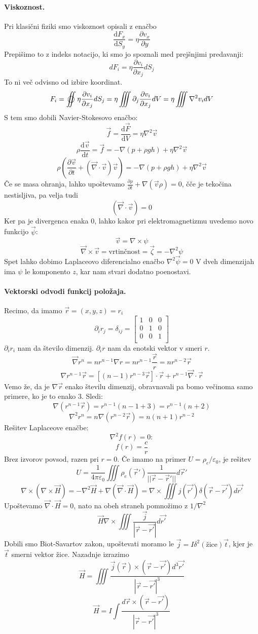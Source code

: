 \documentclass[a4paper]{article}
\newcommand{\vct}[1]{\overrightarrow{#1}}
\newcommand{\pd}[2]{\frac{\partial {#1}}{\partial {#2}}}
\newcommand{\dd}[2]{\frac{\mathrm{d} {#1}}{\mathrm{d} {#2}}}
\begin{document}
\paragraph{Viskoznost.} Pri klasični fiziki smo viskoznost opisali z enačbo
$$\dd{F_x}{S_y} = \eta \pd{v_x}{y}$$
Prepišimo to z indeks notacijo, ki smo jo spoznali med prejšnjimi predavanji:
$$dF_i = \eta\pd{v_i}{x_j}dS_j$$
To ni več odvisno od izbire koordinat.
$$F_i = \varoiint \eta \pd{v_i}{x_j}dS_j = \eta \iiint \partial_j \pd{v_i}{x_j} dV = \eta \iiint \nabla^2 v_i dV$$
S tem smo dobili Navier-Stokesovo enačbo:
$$\vct{f} = \dd{\vct{F}}{V} = \eta \nabla^2\vct{v}$$
$$\rho \dd{\vct{v}}{t} = \vct{f} = -\nabla(p+\rho gh) + \eta\nabla^2\vct{v}$$
$$\rho \left(\pd{\vct{v}}{t} + (\vct\nabla\cdot\vct{v})\vct{v}\right) = -\nabla(p+\rho gh) + \eta\nabla^2\vct{v}$$
Če se masa ohranja, lahko upoštevamo $\displaystyle{\pd{\rho}{t} + \nabla(\vct{v}\rho) = 0}$, čče je tekočina nestisljiva, pa velja tudi
$$(\vct\nabla\cdot\vct{v}) = 0$$
Ker pa je divergenca enaka 0, lahko kakor pri elektromagnetizmu uvedemo novo funkcijo $\vct{\psi}$:
$$\vct{v} = \nabla\times\psi$$
$$\vct{\nabla}\times\vct{v} = \text{vrtinčnost} = \vct\zeta = -\nabla^2\psi$$
Spet lahko dobimo Laplaceovo diferencialno enačbo $\nabla^2\vct{\psi} = 0$
V dveh dimenzijah ima $\psi$ le komponento $z$, kar nam stvari dodatno poenostavi.
\paragraph{Vektorski odvodi funkcij položaja.} Recimo, da imamo $\vct{r} = (x, y, z) = r_i$
$$\partial_ir_j = \delta_{ij} = \begin{bmatrix}
    1 & 0 & 0 \\
    0 & 1 & 0 \\
    0 & 0 & 1 \\
\end{bmatrix}$$
$\partial_i r_i$ nam da število dimenzij. $\partial_ir$ nam da enotski vektor v smeri $r$.
$$\vct\nabla r^n = nr^{n-1}\nabla r = nr^{n-1}\frac{\vct{r}}{r} = nr^{n-2}\vct{r}$$
$$\nabla{r^{n-1}\vct{r}} = [(n-1)r^{n-3}\vct{r}]\cdot\vct{r} + r^{n-1}\vct\nabla\cdot\vct{r}$$
Vemo že, da je $\nabla\vct{r}$ enako številu dimenzij, obravnavali pa bomo večinoma samo primere, ko je to enako 3. Sledi:
$$\nabla (r^{n-1}\vct{r}) = r^{n-1}(n-1+3) = r^{n-1}(n+2)$$
$$\nabla^2r^n = n\nabla(r^{n-2}\vct{r}) = n(n+1)r^{n-2}$$
Rešitev Laplaceove enačbe:
$$\nabla^2f(r) = 0:$$
$$f(r) = \frac{c}{r}$$
Brez izvorov povsod, razen pri $r=0$.
Če imamo na primer $U = \rho_e/\varepsilon_0$, je rešitev $$U = \frac{1}{4\pi\varepsilon_0}\iiint \rho_e(\vct{r}')\frac{1}{||\vct{r} - \vct{r}'||}d\vct{r}'$$
$$\nabla\times\left(\nabla\times\vct{H}\right) = -\nabla^2\vct{H} + \nabla(\vct\nabla\cdot\vct{H}) = \nabla\times\iiint j(\vct{r'}) \delta(\vct{r}-\vct{r'}) d\vct{r'}$$
Upoštevamo $\vct\nabla\cdot\vct{H} = 0$, nato na obeh straneh pomnožimo z $1/\nabla^2$
$$\vct{H} \nabla \times \iiint \frac{\vct{j}}{|\vct{r} - \vct{r'}|}d\vct{r'}$$
Dobili smo Biot-Savartov zakon, upoštevati moramo le $\vct{j} = I\delta^2(\text{žice})\vct{t}$, kjer je $\vct{t}$ smerni vektor žice.
Nazadnje izrazimo $$\vct{H} = \iiint \frac{\vct{j}(\vct{r}) \times (\vct{r} - \vct{r'})d^3\vct{r'}}{|\vct{r} - \vct{r'}|^3}$$
$$\vct{H} = I \int \frac{d\vct{r} \times (\vct{r} - \vct{r'})}{|\vct{r} - \vct{r'}|^3}$$
\end{document}
